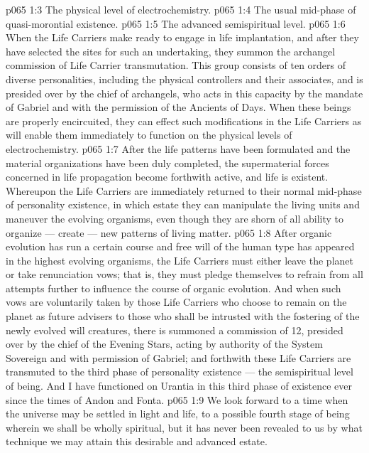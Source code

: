 \vs p065 1:3 \bibnobreakspace The physical level of electrochemistry.
\vs p065 1:4 \bibnobreakspace The usual mid\hyp{}phase of quasi\hyp{}morontial existence.
\vs p065 1:5 \bibnobreakspace The advanced semispiritual level.
\vs p065 1:6 \pc When the Life Carriers make ready to engage in life implantation, and after they have selected the sites for such an undertaking, they summon the archangel commission of Life Carrier transmutation. This group consists of ten orders of diverse personalities, including the physical controllers and their associates, and is presided over by the chief of archangels, who acts in this capacity by the mandate of Gabriel and with the permission of the Ancients of Days. When these beings are properly encircuited, they can effect such modifications in the Life Carriers as will enable them immediately to function on the physical levels of electrochemistry.
\vs p065 1:7 After the life patterns have been formulated and the material organizations have been duly completed, the supermaterial forces concerned in life propagation become forthwith active, and life is existent. Whereupon the Life Carriers are immediately returned to their normal mid\hyp{}phase of personality existence, in which estate they can manipulate the living units and maneuver the evolving organisms, even though they are shorn of all ability to organize --- create --- new patterns of living matter.
\vs p065 1:8 After organic evolution has run a certain course and free will of the human type has appeared in the highest evolving organisms, the Life Carriers must either leave the planet or take renunciation vows; that is, they must pledge themselves to refrain from all attempts further to influence the course of organic evolution. And when such vows are voluntarily taken by those Life Carriers who choose to remain on the planet as future advisers to those who shall be intrusted with the fostering of the newly evolved will creatures, there is summoned a commission of 12, presided over by the chief of the Evening Stars, acting by authority of the System Sovereign and with permission of Gabriel; and forthwith these Life Carriers are transmuted to the third phase of personality existence --- the semispiritual level of being. And I have functioned on Urantia in this third phase of existence ever since the times of Andon and Fonta.
\vs p065 1:9 We look forward to a time when the universe may be settled in light and life, to a possible fourth stage of being wherein we shall be wholly spiritual, but it has never been revealed to us by what technique we may attain this desirable and advanced estate.
